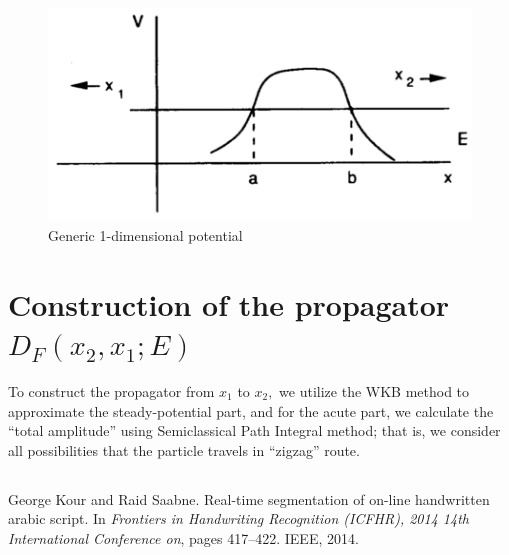 \documentclass{article}
\begin{document}
\begin{figure}
    \centering
    \includegraphics{figures/genericPotential.png}
    \caption{Generic 1-dimensional potential}
    \label{fig:genericPotential}
\end{figure}


\section{Construction of the propagator $D_F(x_2, x_1; E)$}
    To construct the propagator from $x_1$ to $x_2,$ we utilize the WKB method to approximate the steady-potential part, and for the acute part, we calculate the “total amplitude” using Semiclassical Path Integral method; that is, we consider all possibilities that the particle travels in “zigzag” route.
    \subsection{}
    \subsection{}

  
\begin{thebibliography}{1}
    George Kour and Raid Saabne.
    \newblock Real-time segmentation of on-line handwritten arabic script.
    \newblock In {\em Frontiers in Handwriting Recognition (ICFHR), 2014 14th
      International Conference on}, pages 417--422. IEEE, 2014.

\end{thebibliography}
\end{document}
